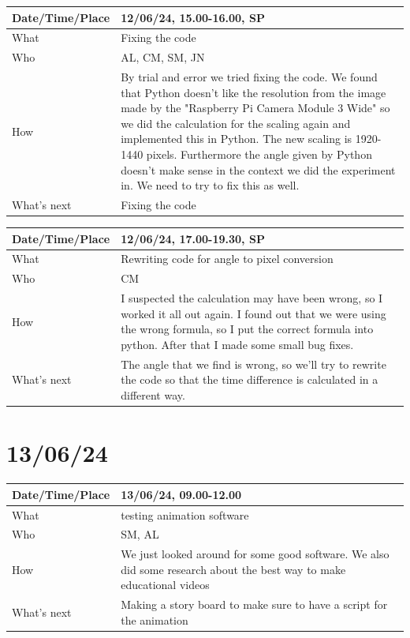 \documentclass{article}
\begin{document}
\begin{table}[H]
\begin{tabular}{|p{1.5in}|p{4in}|}
\hline
Date/Time/Place & 12/06/24, 15.00-16.00, SP \\ \hline
What            &  Fixing the code\\ \hline
Who             &  AL, CM, SM, JN\\ \hline
How             & By trial and error we tried fixing the code. We found that Python doesn't like the resolution from the image made by the "Raspberry Pi Camera Module 3 Wide" so we did the calculation for the scaling again and implemented this in Python. The new scaling is 1920-1440 pixels. Furthermore the angle given by Python doesn't make sense in the context we did the experiment in. We need to try to fix this as well.\\ \hline
What's next     & Fixing the code \\ \hline
\end{tabular}
\end{table}

\begin{table}[H]
\begin{tabular}{|p{1.5in}|p{4in}|}
\hline
Date/Time/Place & 12/06/24, 17.00-19.30, SP \\ \hline
What            & Rewriting code for angle to pixel conversion\\ \hline
Who             & CM \\ \hline
How             & I suspected the calculation may have been wrong, so I worked it all out again. I found out that we were using the wrong formula, so I put the correct formula into python. After that I made some small bug fixes.\\ \hline
What's next     & The angle that we find is wrong, so we'll try to rewrite the code so that the time difference is calculated in a different way.\\ \hline
\end{tabular}
\end{table}

\section{13/06/24}

\begin{table}[H]
\begin{tabular}{|p{1.5in}|p{4in}|}
\hline
Date/Time/Place &  13/06/24, 09.00-12.00\\ \hline
What            &  testing animation software\\ \hline
Who             &  SM, AL\\ \hline
How             &  We just looked around for some good software. We also did some research about the best way to make educational videos\\ \hline
What's next     & Making a story board to make sure to have a script for the animation\\ \hline
\end{tabular}
\end{table}
\end{document}

